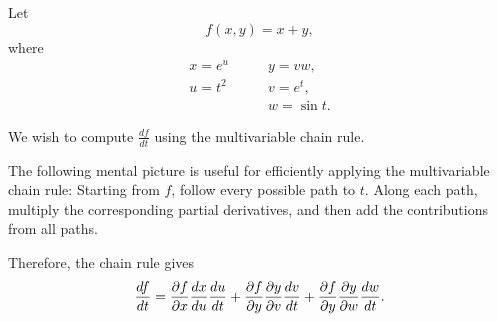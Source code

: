 \begin{example}\label{ex:review-on-multivariable-calculus-continuation-1}
	Let
	\begin{equation}
		f(x,y)=x+y,
		\label{eq:review-on-multivariable-calculus-continuation-1}
	\end{equation}
	where
	\begin{equation}
		\begin{aligned}
			x=e^u & \qquad y=vw,     \\
			u=t^2 & \qquad v=e^t,    \\
			      & \qquad w=\sin t.
		\end{aligned}
		\label{eq:review-on-multivariable-calculus-continuation-2}
	\end{equation}

	We wish to compute $\frac{df}{dt}$ using the multivariable chain rule.

	The following mental picture is useful for efficiently applying the multivariable chain rule: Starting from $f$, follow every possible path to $t$. Along each path, multiply the corresponding partial derivatives, and then add the contributions from all paths.

	\begin{center}
	\end{center}

	Therefore, the chain rule gives
	\begin{equation}
		\frac{df}{dt}
		=
		\frac{\partial f}{\partial x} \frac{dx}{du} \frac{du}{dt} \\
		+
		\frac{\partial f}{\partial y} \frac{\partial y}{\partial v} \frac{dv}{dt} \\
		+
		\frac{\partial f}{\partial y} \frac{\partial y}{\partial w} \frac{dw}{dt}.
		\label{eq:review-on-multivariable-calculus-continuation-3}
	\end{equation}


\end{example}
